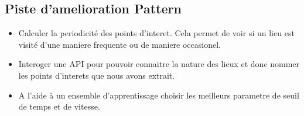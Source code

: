 \documentclass{article}
\begin{document}
\subsection{Piste d'amelioration Pattern}
\begin{itemize}
    \item Calculer la periodicité des points d'interet. Cela permet de voir si un lieu est visité d'une maniere frequente ou de maniere occasionel. 
    \item Interoger une API pour pouvoir connaitre la nature des lieux et donc nommer les points d'interets que nous avons extrait.
    \item A l'aide à un ensemble d'apprentissage choisir les meilleurs parametre de seuil de temps et de vitesse.
\end{itemize}
\end{document}

